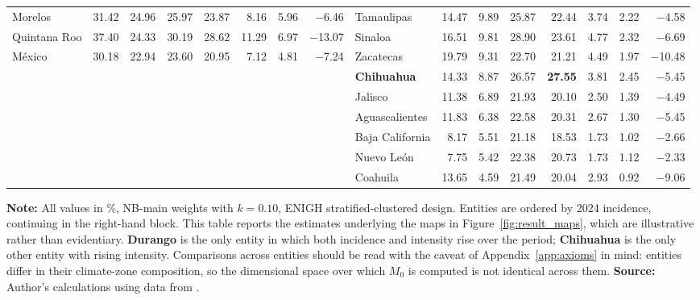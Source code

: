 \documentclass[11pt, a4paper]{article}
\begin{document}
\begin{table}
\begin{tabular}{l rr rr rr r @{\hskip 2em} l rr rr rr r}
Morelos         & 31.42 & 24.96 & 25.97 & 23.87 & 8.16  & 5.96  & $-$6.46  & Tamaulipas          & 14.47 & 9.89  & 25.87 & 22.44 & 3.74 & 2.22 & $-$4.58 \\
Quintana Roo    & 37.40 & 24.33 & 30.19 & 28.62 & 11.29 & 6.97  & $-$13.07 & Sinaloa             & 16.51 & 9.81  & 28.90 & 23.61 & 4.77 & 2.32 & $-$6.69 \\
México          & 30.18 & 22.94 & 23.60 & 20.95 & 7.12  & 4.81  & $-$7.24  & Zacatecas           & 19.79 & 9.31  & 22.70 & 21.21 & 4.49 & 1.97 & $-$10.48 \\
                &       &       &       &       &       &       &          & \textbf{Chihuahua}  & 14.33 & 8.87  & 26.57 & \textbf{27.55} & 3.81 & 2.45 & $-$5.45 \\
                &       &       &       &       &       &       &          & Jalisco             & 11.38 & 6.89  & 21.93 & 20.10 & 2.50 & 1.39 & $-$4.49 \\
                &       &       &       &       &       &       &          & Aguascalientes      & 11.83 & 6.38  & 22.58 & 20.31 & 2.67 & 1.30 & $-$5.45 \\
                &       &       &       &       &       &       &          & Baja California     & 8.17  & 5.51  & 21.18 & 18.53 & 1.73 & 1.02 & $-$2.66 \\
                &       &       &       &       &       &       &          & Nuevo León          & 7.75  & 5.42  & 22.38 & 20.73 & 1.73 & 1.12 & $-$2.33 \\
                &       &       &       &       &       &       &          & Coahuila            & 13.65 & 4.59  & 21.49 & 20.04 & 2.93 & 0.92 & $-$9.06 \\
\bottomrule
\end{tabular}
\begin{justify}
\scriptsize
\textbf{Note:} All values in \%, NB-main weights with $k=0.10$, ENIGH stratified-clustered design. Entities are ordered by 2024 incidence, continuing in the right-hand block. This table reports the estimates underlying the maps in Figure~\ref{fig:result_maps}, which are illustrative rather than evidentiary. \textbf{Durango} is the only entity in which both incidence and intensity rise over the period; \textbf{Chihuahua} is the only other entity with rising intensity. Comparisons across entities should be read with the caveat of Appendix~\ref{app:axioms} in mind: entities differ in their climate-zone composition, so the dimensional space over which $M_0$ is computed is not identical across them. \textbf{Source:} Author's calculations using data from \textcite{enigh2016, enigh2018, enigh2020, enigh2022, enigh2024}.
\end{justify}
\label{tab:states}
\end{table}
\end{document}
